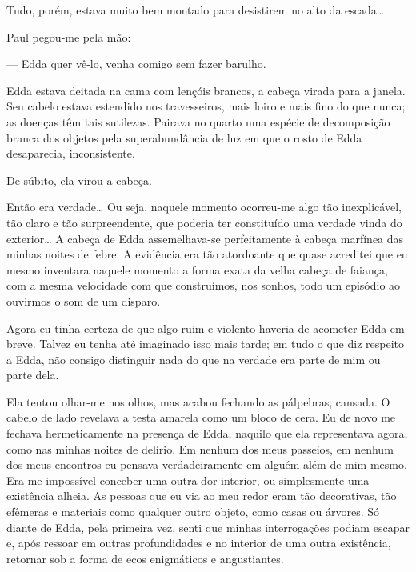 Tudo, porém, estava muito bem montado para desistirem no alto da escada\ldots{}


Paul pegou-me pela mão:

--- Edda quer vê-lo, venha comigo sem fazer barulho.

Edda estava deitada na cama com lençóis brancos, a cabeça virada para a janela. Seu cabelo estava estendido nos travesseiros, mais loiro e mais fino do que nunca; as doenças têm tais sutilezas. Pairava no quarto uma espécie de decomposição branca dos objetos pela superabundância de luz em que o rosto de Edda desaparecia, inconsistente.

De súbito, ela virou a cabeça.

Então era verdade\ldots{} Ou seja, naquele momento ocorreu-me algo tão inexplicável, tão claro e tão surpreendente, que poderia ter constituído uma verdade vinda do exterior\ldots{} A cabeça de Edda assemelhava-se perfeitamente à cabeça marfínea das minhas noites de febre. A evidência era tão atordoante que quase acreditei que eu mesmo inventara naquele momento a forma exata da velha cabeça de faiança, com a mesma velocidade com que construímos, nos sonhos, todo um episódio ao ouvirmos o som de um disparo.  

Agora eu tinha certeza de que algo ruim e violento haveria de acometer Edda em breve. Talvez eu tenha até imaginado isso mais tarde; em tudo o que diz respeito a Edda, não consigo distinguir nada do que na verdade era parte de mim ou parte dela.

Ela tentou olhar-me nos olhos, mas acabou fechando as pálpebras, cansada. O cabelo de lado revelava a testa amarela como um bloco de cera. Eu de novo me fechava hermeticamente na presença de Edda, naquilo que ela representava agora, como nas minhas noites de delírio. Em nenhum dos meus passeios, em nenhum dos meus encontros eu pensava verdadeiramente em alguém além de mim mesmo. Era-me impossível conceber uma outra dor interior, ou simplesmente uma existência alheia. As pessoas que eu via ao meu redor eram tão decorativas, tão efêmeras e materiais como qualquer outro objeto, como casas ou árvores. Só diante de Edda, pela primeira vez, senti que minhas interrogações podiam escapar e, após ressoar em outras profundidades e no interior de uma outra existência, retornar sob a forma de ecos enigmáticos e angustiantes.

